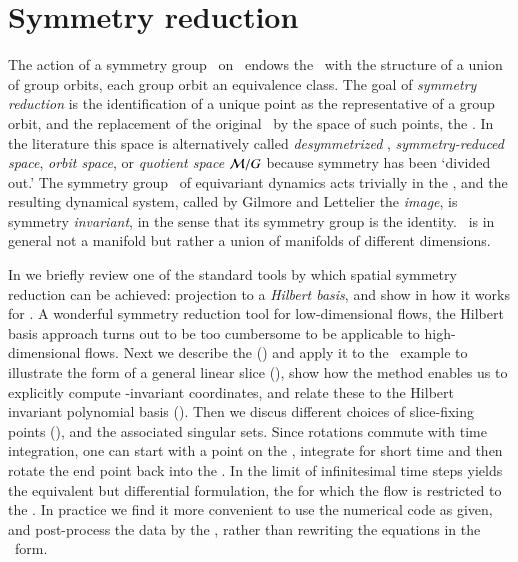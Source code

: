 \documentclass[final,number,sort&compress]{elsarticle}
\begin{document}
\section{\label{s:symmRed} Symmetry reduction}

The action of a symmetry group \Group\ on \pS\ endows the
\statesp\ with the structure of a union of group orbits, each
group orbit an equivalence class. The goal of {\em symmetry
reduction} is the identification of a unique point as the
representative of a group orbit, and the replacement of the
original \statesp\ by the space of such points, the {\em
\reducedsp}. In the literature this space is alternatively
called
\emph{desymmetrized \statesp},
\emph{symmetry-reduced space},
\emph{orbit space}, or \emph{quotient space}
${\cal M}/G$ because symmetry has been `divided out.' {The}
symmetry group \Group\ of equi\-vari\-ant dynamics acts
trivially in {the} \reducedsp, and the resulting dynamical
system, called by Gilmore and Lettelier the
\emph{image}, is symmetry {\em in\-vari\-ant}, in the sense
that its symmetry group is the identity. \Reducedsp\ is in
general not a manifold but rather a union of manifolds of
different dimensions.

In  we briefly review one of the standard
tools by which spatial symmetry reduction can be achieved:
projection to a \emph{Hilbert basis}, and show in
 how it works for \cLf. A wonderful
symmetry reduction tool for low-dimensional flows, the
Hilbert basis approach turns out to be too cumbersome to be
applicable to high-dimensional flows. Next we describe the
\emph{\mframes} () and apply it to the \cLf\
example to illustrate the form of a general linear slice
(), show how the method enables us
to explicitly compute \Group-in\-vari\-ant coordinates, and
relate these to the Hilbert in\-vari\-ant polynomial basis
(). Then we discus different choices
of slice-fixing points (), and the
associated singular sets.
Since rotations commute with time integration, one can
start with a point on the \slice,
integrate for short time and then rotate the
end point back into the \slice.
In  the limit of
infinitesimal time steps yields the equivalent but differential
formulation, the \emph{\mslices} for which the flow is restricted to
the \reducedsp.
In practice we find it more convenient to use the
numerical code as given, and post-process the data by the \mframes,
rather than rewriting the equations in the \mslices\ form.
\end{document}
